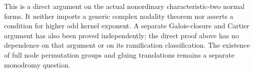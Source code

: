\begin{remark}
\label{rem:root-trigonal-direct-scope-candidate}
This is a direct argument on the actual nonordinary characteristic-two
normal forms. It neither imports a generic complex nodality theorem
nor asserts a condition for higher odd kernel exponent. A separate
Galois-closure and Cartier argument has also been proved independently;
the direct proof above has no dependence on that argument or on its
ramification classification. The existence of full node permutation
groups and gluing translations remains a separate monodromy question.
\end{remark}
